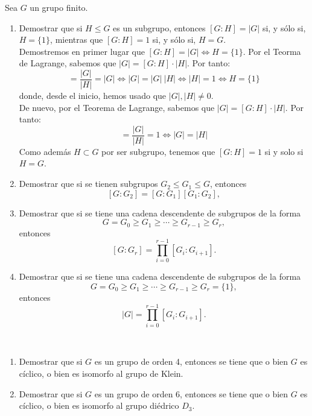 \begin{ejercicio}\label{ej:3.9}
    Sea $G$ un grupo finito.
    \begin{enumerate}
        \item Demostrar que si $H \leq G$ es un subgrupo, entonces $[G : H] = |G|$ si, y sólo si, $H = \{1\}$, mientras que $[G : H] = 1$ si, y sólo si, $H = G$.\\
        
        Demostremos en primer lugar que $[G:H]=|G|\iff H=\{1\}$. Por el Teorma de Lagrange, sabemos que $|G|=[G:H]\cdot |H|$. Por tanto:
        \begin{equation*}
            [G:H]=\dfrac{|G|}{|H|}=|G|\iff |G|=|G|\ |H|\iff |H|=1\iff H=\{1\}
        \end{equation*}
        donde, desde el inicio, hemos usado que $|G|, |H|\neq 0$.\\

        De nuevo, por el Teorema de Lagrange, sabemos que $|G|=[G:H]\cdot |H|$. Por tanto:
        \begin{equation*}
            [G:H]=\dfrac{|G|}{|H|}=1\iff |G|=|H|
        \end{equation*}
        Como además $H\subset G$ por ser subgrupo, tenemos que $[G:H]=1$ si y solo si $H=G$.
        \item Demostrar que si se tienen subgrupos $G_2 \leq G_1 \leq G$, entonces
        \[
            [G : G_2] = [G : G_1][G_1 : G_2],
        \]
        \item Demostrar que si se tiene una cadena descendente de subgrupos de la forma
        \[
            G = G_0 \geq G_1 \geq \cdots \geq G_{r - 1} \geq G_r,
        \]
        entonces
        \[
            [G : G_r] = \prod_{i = 0}^{r - 1}[G_i : G_{i + 1}].
        \]
        \item Demostrar que si se tiene una cadena descendente de subgrupos de la forma
        \[
            G = G_0 \geq G_1 \geq \cdots \geq G_{r - 1} \geq G_r = \{1\},
        \]
        entonces
        \[
            |G| = \prod_{i = 0}^{r - 1}[G_i : G_{i + 1}].
        \]
    \end{enumerate}
\end{ejercicio}

\begin{ejercicio}\label{ej:3.10}~
    \begin{enumerate}
        \item Demostrar que si $G$ es un grupo de orden 4, entonces se tiene que o bien $G$ es cíclico, o bien es isomorfo al grupo de Klein.
        \item Demostrar que si $G$ es un grupo de orden 6, entonces se tiene que o bien $G$ es cíclico, o bien es isomorfo al grupo diédrico $D_3$.
    \end{enumerate}
\end{ejercicio}


